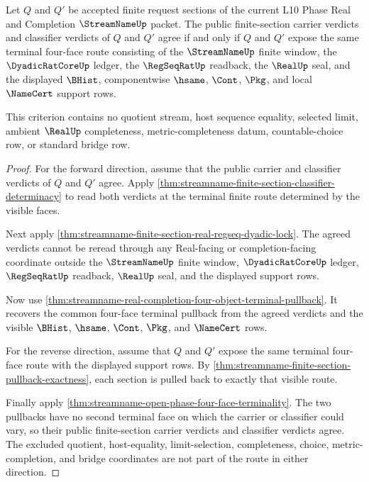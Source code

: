 \begin{theorem}
\label{thm:streamname-terminal-face-iff}
Let $Q$ and $Q'$ be accepted finite request sections of the current L10 Phase
Real and Completion $\StreamNameUp$ packet. The public finite-section carrier
verdicts and classifier verdicts of $Q$ and $Q'$ agree if and only if $Q$ and
$Q'$ expose the same terminal four-face route consisting of the
$\StreamNameUp$ finite window, the $\DyadicRatCoreUp$ ledger, the
$\RegSeqRatUp$ readback, the $\RealUp$ seal, and the displayed $\BHist$,
componentwise $\hsame$, $\Cont$, $\Pkg$, and local $\NameCert$ support rows.

This criterion contains no quotient stream, host sequence equality, selected
limit, ambient $\RealUp$ completeness, metric-completeness datum,
countable-choice row, or standard bridge row.
\end{theorem}
\begin{proof}
For the forward direction, assume that the public carrier and classifier
verdicts of $Q$ and $Q'$ agree. Apply
\autoref{thm:streamname-finite-section-classifier-determinacy} to read both
verdicts at the terminal finite route determined by the visible faces.

Next apply \autoref{thm:streamname-finite-section-real-regseq-dyadic-lock}.
The agreed verdicts cannot be reread through any Real-facing or
completion-facing coordinate outside the $\StreamNameUp$ finite window,
$\DyadicRatCoreUp$ ledger, $\RegSeqRatUp$ readback, $\RealUp$ seal, and the
displayed support rows.

Now use \autoref{thm:streamname-real-completion-four-object-terminal-pullback}.
It recovers the common four-face terminal pullback from the agreed verdicts and
the visible $\BHist$, $\hsame$, $\Cont$, $\Pkg$, and $\NameCert$ rows.

For the reverse direction, assume that $Q$ and $Q'$ expose the same terminal
four-face route with the displayed support rows. By
\autoref{thm:streamname-finite-section-pullback-exactness}, each section is
pulled back to exactly that visible route.

Finally apply \autoref{thm:streamname-open-phase-four-face-terminality}. The
two pullbacks have no second terminal face on which the carrier or classifier
could vary, so their public finite-section carrier verdicts and classifier
verdicts agree. The excluded quotient, host-equality, limit-selection,
completeness, choice, metric-completion, and bridge coordinates are not part of
the route in either direction.
\end{proof}

